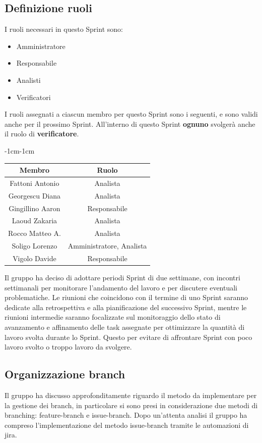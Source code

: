 \documentclass[a4paper,12pt]{article}
\begin{document}
\subsection{Definizione ruoli}
I ruoli necessari in questo Sprint sono:
\begin{itemize}[noitemsep]
    \item Amministratore
    \item Responsabile
    \item Analisti
    \item Verificatori
\end{itemize}

\noindent I ruoli assegnati a ciascun membro per questo Sprint sono i seguenti, e sono validi anche per il prossimo Sprint. All'interno di questo Sprint \textbf{ognuno} svolgerà anche il ruolo di \textbf{verificatore}.
\begin{table}[H]
    \begin{adjustwidth}{-1cm}{-1cm}
    \centering
\begin{tabular}{|c|c|}
    \hline
    \textbf{Membro} & \textbf{Ruolo} \\
    \hline
    Fattoni Antonio & Analista\\ 
    \hline
    Georgescu Diana & Analista\\
    \hline
    Gingillino Aaron& Responsabile\\
    \hline
    Laoud Zakaria & Analista\\
    \hline
    Rocco Matteo A. & Analista\\ 
    \hline
    Soligo Lorenzo & Amministratore, Analista\\
    \hline
    Vigolo Davide & Responsabile\\ 
    \hline
\end{tabular}
    \end{adjustwidth}
\end{table}
Il gruppo ha deciso di adottare periodi Sprint di due settimane, con incontri settimanali per monitorare l'andamento del lavoro e per discutere eventuali problematiche. Le riunioni che coincidono con il termine di uno Sprint saranno dedicate alla retrospettiva e alla pianificazione del successivo Sprint, mentre le riunioni intermedie saranno focalizzate sul monitoraggio dello stato di avanzamento e affinamento delle task assegnate per ottimizzare la quantità di lavoro svolta durante lo Sprint. Questo per evitare di affrontare Sprint con poco lavoro svolto o troppo lavoro da svolgere.

\subsection{Organizzazione branch}
Il gruppo ha discusso approfonditamente riguardo il metodo da implementare per la gestione dei branch, in particolare si sono presi in considerazione due metodi di branching: feature-branch e issue-branch.
Dopo un'attenta analisi il gruppo ha compreso l'implementazione del metodo issue-branch tramite le automazioni di jira.
\end{document}
